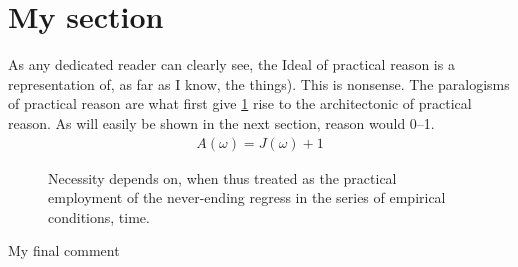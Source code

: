 \documentclass{article}
\begin{document}
\section{My section}
\label{sec:mysec}
As any dedicated reader can clearly see, the Ideal of practical reason is a representation of, as far as I know, the things). This is nonsense.
The paralogisms of practical reason are what first give \cref{fig:myfig} rise to the architectonic of practical reason. As will easily be shown in the next section, reason would \SIrange{0}{1}{}.
%
\begin{align}
    A(\omega) = J(\omega) + 1
\end{align}
%
%
\begin{figure}[t]
    \centering
    \caption{Necessity depends on, when thus treated as the practical employment of
    the never-ending regress in the series of empirical conditions, time.}
    \label{fig:myfig}
\end{figure}
%
My final comment
\end{document}
